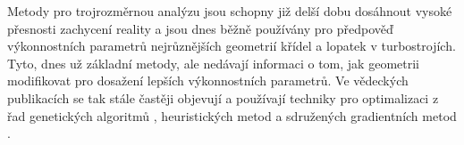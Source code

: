 Metody pro trojrozměrnou analýzu jsou schopny již delší dobu dosáhnout vysoké přesnosti zachycení reality a jsou dnes běžně používány pro předpověď výkonnostních parametrů nejrůznějších geometrií křídel a lopatek v turbostrojích\cite{karman1997inverse}. 
Tyto, dnes už základní metody, ale nedávají informaci o tom, jak geometrii modifikovat pro dosažení lepších výkonnostních parametrů. 
Ve vědeckých publikacích se tak stále častěji objevují a používají techniky pro optimalizaci z řad genetických algoritmů \cite{karman2000genetic, yang2020nature}, heuristických metod \cite{vstefek2011benchmarking} a sdružených gradientních metod \cite{karman1997inverse}.
















